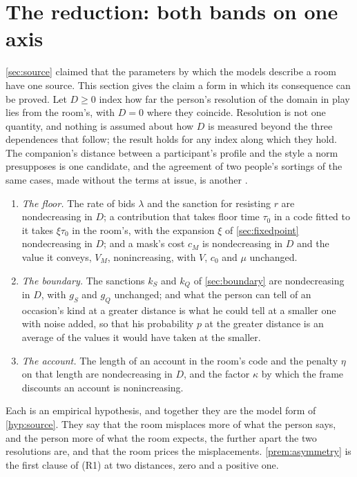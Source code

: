 \section{The reduction: both bands on one axis}\label{sec:reduction}

\autoref{sec:source} claimed that the parameters by which the models describe a room have one source. This section gives the claim a form in which its consequence can be proved. Let $D \ge 0$ index how far the person's resolution of the domain in play lies from the room's, with $D = 0$ where they coincide. Resolution is not one quantity, and nothing is assumed about how $D$ is measured beyond the three dependences that follow; the result holds for any index along which they hold. The companion's distance between a participant's profile and the style a norm presupposes is one candidate, and the agreement of two people's sortings of the same cases, made without the terms at issue, is another \cite{NormCost}.
\begin{enumerate}[label=(R\arabic*)]
\item \emph{The floor.} The rate of bids $\lambda$ and the sanction for resisting $r$ are nondecreasing in $D$; a contribution that takes floor time $\tau_0$ in a code fitted to it takes $\xi\tau_0$ in the room's, with the expansion $\xi$ of \autoref{sec:fixedpoint} nondecreasing in $D$; and a mask's cost $c_M$ is nondecreasing in $D$ and the value it conveys, $V_M$, nonincreasing, with $V$, $c_0$ and $\mu$ unchanged.
\item \emph{The boundary.} The sanctions $k_S$ and $k_Q$ of \autoref{sec:boundary} are nondecreasing in $D$, with $g_S$ and $g_Q$ unchanged; and what the person can tell of an occasion's kind at a greater distance is what he could tell at a smaller one with noise added, so that his probability $p$ at the greater distance is an average of the values it would have taken at the smaller.
\item \emph{The account.} The length of an account in the room's code and the penalty $\eta$ on that length are nondecreasing in $D$, and the factor $\kappa$ by which the frame discounts an account is nonincreasing.
\end{enumerate}
Each is an empirical hypothesis, and together they are the model form of \autoref{hyp:source}. They say that the room misplaces more of what the person says, and the person more of what the room expects, the further apart the two resolutions are, and that the room prices the misplacements. \autoref{prem:asymmetry} is the first clause of (R1) at two distances, zero and a positive one.


